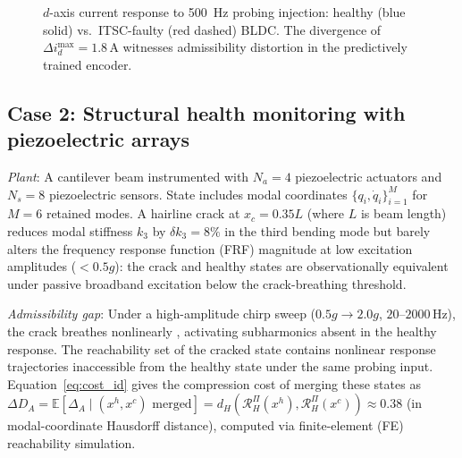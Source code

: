 \documentclass[10pt,twocolumn]{article}
\theoremstyle{plain}
\theoremstyle{definition}
\theoremstyle{remark}
\newcommand{\RHP}{\mathcal{R}_{H}^{\Pi}}
\newcommand{\E}{\mathbb{E}}
\begin{document}
\begin{figure}[t]
\centering
{}
\caption{$d$-axis current response to \SI{500}{\hertz} probing injection:
healthy (blue solid) vs.\ ITSC-faulty (red dashed) BLDC. The divergence
of $\Delta i_d^{\max} = 1.8$\,A witnesses admissibility distortion in the
predictively trained encoder.}
\label{fig:bldc_probe}
\end{figure}

\subsection{Case 2: Structural health monitoring with piezoelectric arrays}

\textit{Plant}: A cantilever beam instrumented with $N_a = 4$ piezoelectric
actuators and $N_s = 8$ piezoelectric sensors. State includes modal coordinates
$\{q_i, \dot{q}_i\}_{i=1}^{M}$ for $M = 6$ retained modes. A hairline crack
at $x_c = 0.35L$ (where $L$ is beam length) reduces modal stiffness
$k_3$ by $\delta k_3 = 8\%$ in the third bending mode but barely alters the
frequency response function (FRF) magnitude at low excitation amplitudes
($<0.5g$): the crack and healthy states are observationally equivalent under
passive broadband excitation below the crack-breathing threshold.

\textit{Admissibility gap}: Under a high-amplitude chirp sweep
($0.5g \to 2.0g$, $20$--$2000$\,Hz), the crack breathes nonlinearly
\citep{worden2007nonlinear}, activating subharmonics absent in the healthy
response. The reachability set of the cracked state contains nonlinear
response trajectories inaccessible from the healthy state under the same
probing input. Equation~\eqref{eq:cost_id} gives the compression cost
of merging these states as $\Delta D_A = \E[\Delta_A \mid (x^h, x^c)
\text{ merged}] = d_H(\RHP(x^h),\RHP(x^c)) \approx 0.38$ (in
modal-coordinate Hausdorff distance), computed via finite-element (FE)
reachability simulation.
\end{document}
